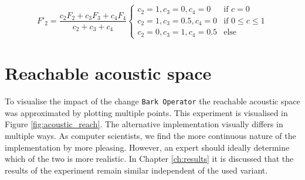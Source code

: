 \begin{equation}
  F'_2 = \frac{c_2F_2 + c_3F_3 + c_4F_4}{c_2 + c_3 + c_4}
    \begin{cases}
      c_2 = 1, c_3 = 0, c_4 = 0 & \text{if } c = 0 \\
      c_2 = 1, c_3 = 0.5, c_4 = 0 & \text{if } 0 \leq c \leq 1 \\
      c_2 = 0, c_3 = 1, c_4 = 0.5 & \text{else}
    \end{cases} 
\label{eq:effective_second_formant}      
\end{equation}


\section{Reachable acoustic space}
\label{sec:reachable_acoustic_space}

To visualise the impact of the change \texttt{Bark Operator} the reachable acoustic space was approximated by plotting multiple points.
This experiment is visualised in Figure \ref{fig:acoustic_reach}.
The alternative implementation visually differs in multiple ways.
As computer scientists, we find the more continuous nature of the implementation by \citet{deBoer2000} more pleasing.
However, an expert should ideally determine which of the two is more realistic.
In Chapter \ref{ch:results} it is discussed that the results of the experiment remain similar independent of the used variant.

